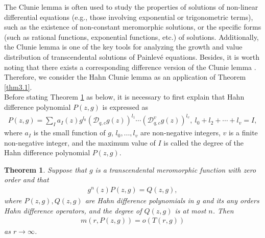 \documentclass[sn-mathphys-num]{sn-jnl}%
\theoremstyle{thmstyleone}%
\newtheorem{theorem}{Theorem}%
\theoremstyle{thmstyletwo}%
\theoremstyle{thmstylethree}%
\begin{document}
\indent The Clunie lemma \cite{hayman} is often used to study the properties of solutions of non-linear differential equations (e.g., those involving exponential or trigonometric terms), such as the existence of non-constant meromorphic solutions, or the specific forms (such as rational functions, exponential functions, etc.) of solutions. Additionally, the Clunie lemma is one of the key tools for analyzing the growth and value distribution of transcendental solutions of Painlev\'{e} equations. Besides, it is worth noting that there exists a corresponding difference version of the Clunie lemma \cite{chen}. Therefore, we consider the Hahn Clunie lemma as an application of Theorem \ref{thm3.1}.\\
\indent Before stating Theorem \ref{thm2.5} as below, it is necessary to first explain that Hahn difference polynomial \(P(z,g)\) is expressed as
\begin{align*}
	P(z,g)=\sum_{I} a_{I}(z)g^{l_{0}}(\mathcal{D}_{q,c}g(z))^{l_{1}}\cdots(\mathcal{D}^{v}_{q,c}g(z))^{l_{v}},~l_{0}+l_{2}+\cdots+l_{v}=I,	
\end{align*}
where \(a_{I}\) is the small function of \(g\), \(l_{0},...,l_{v}\) are non-negative integers, \(v\) is a finite non-negative integer, and the maximum value of \(I\) is called the degree of the Hahn difference polynomial \(P(z,g)\).
\begin{theorem}\label{thm2.5}
	Suppose that \(g\) is a transcendental meromorphic function with zero order and that
	\begin{align*}
		g^{n}(z)P(z,g)=Q(z,g),
	\end{align*}
	where \(P(z,g), Q(z,g)\) are Hahn difference polynomials in \(g\) and its any orders Hahn difference operators, and the degree of \(Q(z,g)\) is at most \(n\). Then
	\begin{align*}
		m(r,P(z,g))=o(T(r,g))
	\end{align*}
	as \(r\to\infty\).
\end{theorem}
\end{document}
